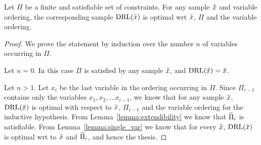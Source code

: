 \begin{thm}%
    Let $\Pi$ be a finite and satisfiable set of constraints. For any sample $\tilde{x}$ and variable ordering, the corresponding sample $\text{DRL}(\tilde{x})$ is optimal wrt $\tilde{x}$, $\Pi$ and the variable ordering.
\end{thm}

\begin{proof}
    We prove the statement by induction over the number $n$ of variables occurring in $\Pi$.

    Let $n=0$. In this case $\Pi$ is satisfied by any sample $\tilde{x}$, and $\text{DRL}(\tilde{x})= \tilde{x}$.

    Let $n > 1$.     Let $x_i$ be the last variable in the ordering occurring in $\Pi$.
Since $\Pi_{i-1}$ contains only the variables $x_1, x_2, \ldots x_{i-1}$, we know that for any sample $\tilde{x}$, $\text{DRL}(\tilde{x})$ is optimal with respect to $\tilde{x}$, $\Pi_{i-1}$ and the variable ordering for the inductive hypothesis. From Lemma~\ref{lemma:extendibility} we know that  $\widetilde{\Pi}_{i}$ is satisfiable. From Lemma~\ref{lemma:single_var} we know that for every $\tilde{x}$, $\text{DRL}(\tilde{x})$ is optimal wrt to $\tilde{x}$ and $\widetilde{\Pi}_{i}$, and hence the thesis. 
\end{proof}